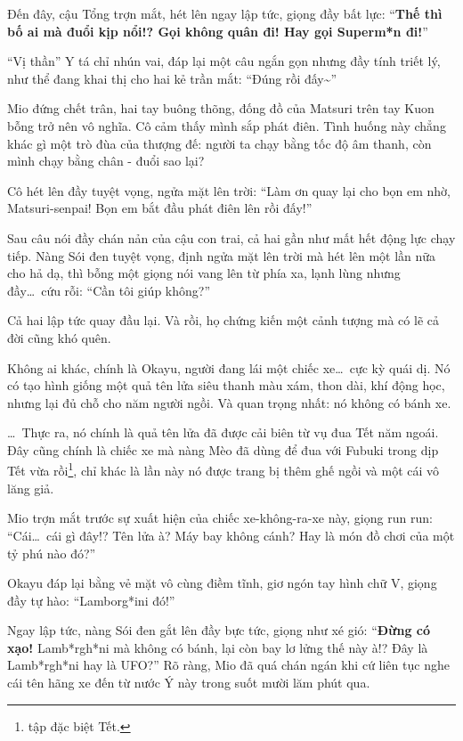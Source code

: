 \documentclass[../main.tex]{subfiles}
\begin{document}
Đến đây, cậu Tổng trợn mắt, hét lên ngay lập tức, giọng đầy bất lực: ``\textbf{Thế thì bố ai mà đuổi kịp nổi!? Gọi không quân đi! Hay gọi Superm*n đi!}''

``Vị thần'' Y tá chỉ nhún vai, đáp lại một câu ngắn gọn nhưng đầy tính triết lý, như thể đang khai thị cho hai kẻ trần mắt: ``Đúng rồi đấy\~{}''

Mio đứng chết trân, hai tay buông thõng, đống đồ của Matsuri trên tay Kuon bỗng trở nên vô nghĩa. Cô cảm thấy mình sắp phát điên. Tình huống này chẳng khác gì một trò đùa của thượng đế: người ta chạy bằng tốc độ âm thanh, còn mình chạy bằng chân - đuổi sao lại?

Cô hét lên đầy tuyệt vọng, ngửa mặt lên trời: ``Làm ơn quay lại cho bọn em nhờ, Matsuri-senpai! Bọn em bắt đầu phát điên lên rồi đấy!''

\ct

Sau câu nói đầy chán nản của cậu con trai, cả hai gần như mất hết động lực chạy tiếp. Nàng Sói đen tuyệt vọng, định ngửa mặt lên trời mà hét lên một lần nữa cho hả dạ, thì bỗng một giọng nói vang lên từ phía xa, lạnh lùng nhưng đầy\dots\ cứu rỗi: ``Cần tôi giúp không?''

Cả hai lập tức quay đầu lại. Và rồi, họ chứng kiến một cảnh tượng mà có lẽ cả đời cũng khó quên.

Không ai khác, chính là Okayu, người đang lái một chiếc xe\dots\ cực kỳ quái dị. Nó có tạo hình giống một quả tên lửa siêu thanh màu xám, thon dài, khí động học, nhưng lại đủ chỗ cho năm người ngồi. Và quan trọng nhất: nó không có bánh xe.


\dots\ Thực ra, nó chính là quả tên lửa đã được cải biên từ vụ đua Tết năm ngoái. Đây cũng chính là chiếc xe mà nàng Mèo đã dùng để đua với Fubuki trong dịp Tết vừa rồi\footnote{tập đặc biệt Tết.}, chỉ khác là lần này nó được trang bị thêm ghế ngồi và một cái vô lăng giả.

Mio trợn mắt trước sự xuất hiện của chiếc xe-không-ra-xe này, giọng run run: ``Cái\dots\ cái gì đây!? Tên lửa à? Máy bay không cánh? Hay là món đồ chơi của một tỷ phú nào đó?''

Okayu đáp lại bằng vẻ mặt vô cùng điềm tĩnh, giơ ngón tay hình chữ V, giọng đầy tự hào: ``Lamborg*ini đó!''

Ngay lập tức, nàng Sói đen gắt lên đầy bực tức, giọng như xé gió: ``\textbf{Đừng có xạo!} Lamb*rgh*ni mà không có bánh, lại còn bay lơ lửng thế này à!? Đây là Lamb*rgh*ni hay là UFO?'' Rõ ràng, Mio đã quá chán ngán khi cứ liên tục nghe cái tên hãng xe đến từ nước Ý này trong suốt mười lăm phút qua.
\end{document}
